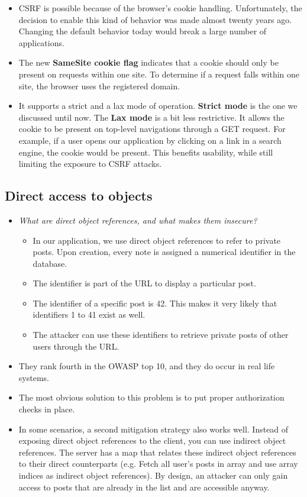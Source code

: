 \documentclass[../main.tex]{subfiles}
\begin{document}
\begin{itemize}
\item CSRF is possible because of the browser's cookie handling. Unfortunately, the decision to enable this kind of behavior was made almost twenty years ago. Changing the default behavior today would break a large number of applications.
\item The new \textbf{SameSite cookie flag} indicates that a cookie should only be present on requests within one site. To determine if a request falls within one site, the browser uses the registered domain.
\item It supports a strict and a lax mode of operation. \textbf{Strict mode} is the one we discussed until now. The \textbf{Lax mode} is a bit less restrictive. It allows the cookie to be present on top-level navigations through a GET request. For example, if a user opens our application by clicking on a link in a search engine,
the cookie would be present. This benefits usability, while still limiting the exposure to CSRF attacks.
\end{itemize}

\subsection{Direct access to objects}
\begin{itemize}
\item \emph{What are direct object references, and what makes them insecure?}
\begin{itemize}
\item In our application, we use direct object references to refer to private posts. Upon creation, every note is assigned a numerical identifier in the database.
\item  The identifier is part of the URL to display a particular post.
\item The identifier of a specific post is 42. This makes it very likely that identifiers 1 to 41 exist as well.
\item The attacker can use these identifiers to retrieve private posts of other users through the URL.
\end{itemize}
\item They rank fourth in the OWASP top 10, and they do occur in real life systems.
\item The most obvious solution to this problem is to put proper authorization checks in place.
\item In some scenarios, a second mitigation strategy also works well. Instead of exposing direct object references to the client, you can use indirect object references. The server has a map that relates these indirect object references to their direct counterparts (e.g. Fetch all user's posts in array and use array indices as indirect object references). By design, an attacker can only gain access to posts that are already in the list and are accessible anyway.
\end{itemize}
\end{document}
